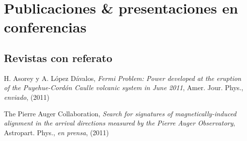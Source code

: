 \documentclass[11pt, a4paper]{article}
\newcommand{\years}[1]{\marginnote{\scriptsize #1}}
\begin{document}
% 
% 
% 

\section*{Publicaciones \& presentaciones en conferencias}

\subsection*{Revistas con referato}
\noindent

\years{2011}H. Asorey y A. López Dávalos, {\emph{Fermi Problem: Power developed at the eruption of the Puyehue-Cordón Caulle volcanic system in June 2011}}, Amer. Jour. Phys., {\emph{enviado}}, (2011)

\years{2011}The Pierre Auger Collaboration, {\emph{Search for signatures
of magnetically-induced alignment in the arrival directions measured by the
Pierre Auger Observatory}}, Astropart. Phys., {\emph{en prensa}}, (2011)
\end{document}
